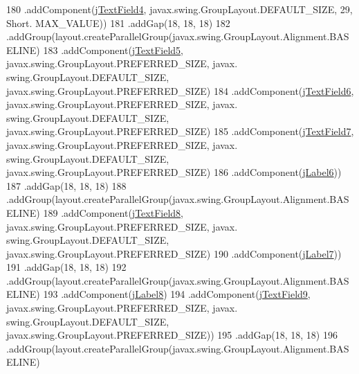 \begin{DoxyCode}
180                     .addComponent(\mbox{\hyperlink{class_interfaz_package_1_1_alta_diccionario_a66e68fc19055b7af4fcac12091ab7c45}{jTextField4}}, javax.swing.GroupLayout.DEFAULT\_SIZE, 29, Short.
      MAX\_VALUE))
181                 .addGap(18, 18, 18)
182                 .addGroup(layout.createParallelGroup(javax.swing.GroupLayout.Alignment.BASELINE)
183                     .addComponent(\mbox{\hyperlink{class_interfaz_package_1_1_alta_diccionario_a56756a5f37a4a3056ce24d5570b99d61}{jTextField5}}, javax.swing.GroupLayout.PREFERRED\_SIZE, javax.
      swing.GroupLayout.DEFAULT\_SIZE, javax.swing.GroupLayout.PREFERRED\_SIZE)
184                     .addComponent(\mbox{\hyperlink{class_interfaz_package_1_1_alta_diccionario_af4d8c6da79f9c1a9c5d4d8b9f70935c0}{jTextField6}}, javax.swing.GroupLayout.PREFERRED\_SIZE, javax.
      swing.GroupLayout.DEFAULT\_SIZE, javax.swing.GroupLayout.PREFERRED\_SIZE)
185                     .addComponent(\mbox{\hyperlink{class_interfaz_package_1_1_alta_diccionario_a21d52c5fe53e1a05874c6771dc828a1d}{jTextField7}}, javax.swing.GroupLayout.PREFERRED\_SIZE, javax.
      swing.GroupLayout.DEFAULT\_SIZE, javax.swing.GroupLayout.PREFERRED\_SIZE)
186                     .addComponent(\mbox{\hyperlink{class_interfaz_package_1_1_alta_diccionario_a0c561754fd465af966a7cc6a1bc44e0b}{jLabel6}}))
187                 .addGap(18, 18, 18)
188                 .addGroup(layout.createParallelGroup(javax.swing.GroupLayout.Alignment.BASELINE)
189                     .addComponent(\mbox{\hyperlink{class_interfaz_package_1_1_alta_diccionario_a3e91b2eb94fa14f68ad137f48e0500f6}{jTextField8}}, javax.swing.GroupLayout.PREFERRED\_SIZE, javax.
      swing.GroupLayout.DEFAULT\_SIZE, javax.swing.GroupLayout.PREFERRED\_SIZE)
190                     .addComponent(\mbox{\hyperlink{class_interfaz_package_1_1_alta_diccionario_a6b9331f8fb5ef9724ed7f357a9161928}{jLabel7}}))
191                 .addGap(18, 18, 18)
192                 .addGroup(layout.createParallelGroup(javax.swing.GroupLayout.Alignment.BASELINE)
193                     .addComponent(\mbox{\hyperlink{class_interfaz_package_1_1_alta_diccionario_a11b6f4d3aa1422c2bf0b283f64e86c29}{jLabel8}})
194                     .addComponent(\mbox{\hyperlink{class_interfaz_package_1_1_alta_diccionario_a06c739f8e895e3be23782b6220a1bd91}{jTextField9}}, javax.swing.GroupLayout.PREFERRED\_SIZE, javax.
      swing.GroupLayout.DEFAULT\_SIZE, javax.swing.GroupLayout.PREFERRED\_SIZE))
195                 .addGap(18, 18, 18)
196                 .addGroup(layout.createParallelGroup(javax.swing.GroupLayout.Alignment.BASELINE)

\end{DoxyCode}
